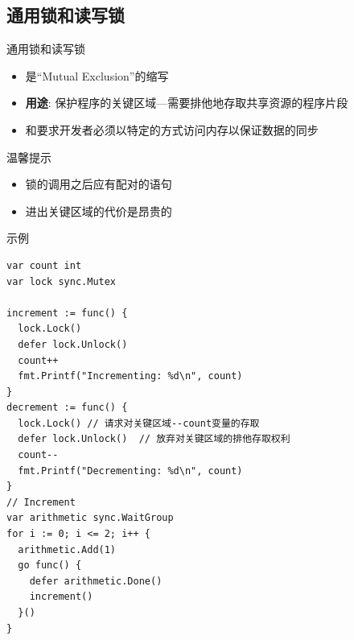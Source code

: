 \subsection{通用锁\Mutex 和读写锁\RWMutex }
\begin{frame}{通用锁\Mutex 和读写锁\RWMutex }
    \begin{itemize}
        \item \Mutex 是``Mutual Exclusion''的缩写
        \item \textbf{用途}: 保护程序的\alert{关键区域}---需要排他地存取共享资源的程序片段
        \item \Mutex 和\RWMutex 要求开发者必须以\alert{特定的方式}访问内存以保证数据的同步
    \end{itemize}


    \pause
    \begin{exampleblock}{温馨提示}
        \begin{itemize}
            \item 锁的调用之后应有配对的语句
            \item \alert{进出关键区域的代价是昂贵的}
        \end{itemize}    
    \end{exampleblock}
\end{frame}

\iffalse
\begin{frame}[fragile]{示例}
\begin{lstlisting}
var count int
var lock sync.Mutex

increment := func() {
  lock.Lock()
  defer lock.Unlock()
  count++
  fmt.Printf("Incrementing: %d\n", count)
}
decrement := func() {
  lock.Lock() // 请求对关键区域--count变量的存取
  defer lock.Unlock()  // 放弃对关键区域的排他存取权利
  count--
  fmt.Printf("Decrementing: %d\n", count)
}
// Increment
var arithmetic sync.WaitGroup
for i := 0; i <= 2; i++ {
  arithmetic.Add(1)
  go func() {
    defer arithmetic.Done()
    increment()
  }()
}
\end{lstlisting}
\end{frame}

